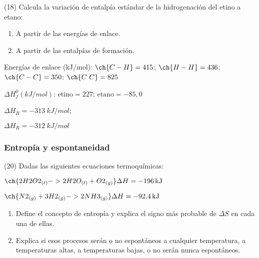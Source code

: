 \documentclass[10pt]{article}
\newenvironment{gexdatos}{
    \noindent\makebox[0pt][r]{\textit{Datos:}}
}{\vspace{5pt}}
\begin{document}
\begin{multicols}{2}
\begin{exercise}
  (18) Calcula la variación de entalpía estándar de la hidrogenación del etino a etano:

  \begin{enumerate}
    \item A partir de las energías de enlace.
    \item A partir de las entalpías de formación.
  \end{enumerate}

  \begin{gexdatos}
    Energías de enlace (\si{kJ/mol}): \( \ch{C-H} = 415 \); \( \ch{H-H} = 436 \); \( \ch{C-C} = 350 \): \( \ch{C~C} = 825 \)

    \( \Delta H^0_f (\si{kJ/mol}) \): \( \textrm{etino} = 227 \); \( \textrm{etano} = -85,0 \)
  \end{gexdatos}


\end{exercise}

\begin{solution}
  \begin{enumerate*}
    \item \( \Delta H_R = \SI{-313}{kJ/mol} \); \item \( \Delta H_R = \SI{-312}{kJ/mol} \)
  \end{enumerate*}
\end{solution}



\subsubsection{Entropía y espontaneidad}

\begin{exercise}
  (20) Dadas las siguientes ecuaciones termoquímicas:

  \( \ch{2 H2O2_{(l)} -> 2 H2O_{(l)} + O2_{(g)}} \Delta H = \SI{-196}{kJ} \)

  \( \ch{N2_{(g)} + 3 H2_{(g)} -> 2 NH3 _{(g)}} \Delta H = \SI{-92.4}{kJ} \)

  \begin{enumerate}
    \item Define el concepto de entropía y explica el signo más probable de \( \Delta S \) en cada una de ellas.
    \item Explica si esos procesos serán o no espontáneos a cualquier
    temperatura, a temperaturas altas, a temperaturas bajas, o no serán nunca espontáneos.
  \end{enumerate}
\end{exercise}


\end{multicols}
\end{document}
